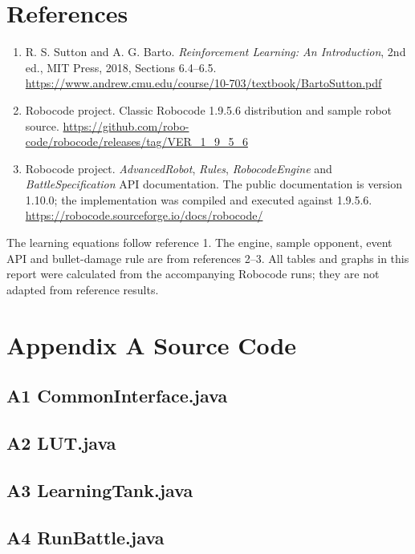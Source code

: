 \documentclass[11pt,letterpaper]{article}
\begin{document}
\section*{References}
\begin{enumerate}
\item R. S. Sutton and A. G. Barto. \emph{Reinforcement Learning: An Introduction}, 2nd ed., MIT Press, 2018, Sections 6.4--6.5. \url{https://www.andrew.cmu.edu/course/10-703/textbook/BartoSutton.pdf}
\item Robocode project. Classic Robocode 1.9.5.6 distribution and sample robot source. \url{https://github.com/robo-code/robocode/releases/tag/VER_1_9_5_6}
\item Robocode project. \emph{AdvancedRobot}, \emph{Rules}, \emph{RobocodeEngine} and \emph{BattleSpecification} API documentation. The public documentation is version 1.10.0; the implementation was compiled and executed against 1.9.5.6. \url{https://robocode.sourceforge.io/docs/robocode/}
\end{enumerate}
The learning equations follow reference 1. The engine, sample opponent, event API and bullet-damage rule are from references 2--3. All tables and graphs in this report were calculated from the accompanying Robocode runs; they are not adapted from reference results.

\newpage
\appendix
{}
\section*{Appendix A Source Code}
\subsection*{A1 CommonInterface.java}

\subsection*{A2 LUT.java}

\newpage
\subsection*{A3 LearningTank.java}

\newpage
\subsection*{A4 RunBattle.java}

\newpage
\end{document}
